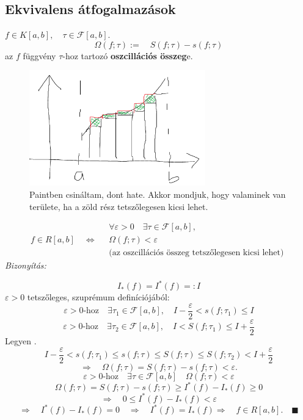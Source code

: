 \documentclass[a4paper,11.5pt]{article}
\begin{document}
	\subsection{Ekvivalens átfogalmazások}
	\begin{definition}
		$f\in K[a,b],\quad \tau\in\mathcal{F}[a,b]$.
		\[ \varOmega(f;\tau):=\quad S(f;\tau)-s(f;\tau) \]
		az $f$ függvény $\tau$-hoz tartozó \textbf{oszcillációs összeg}e.
	\end{definition}
	\begin{note}
		\begin{figure}[H]
			\centering
			\includegraphics[height=5cm]{kepek/tau.png}
			\caption{Paintben csináltam, dont hate. Akkor mondjuk, hogy valaminek van területe, ha a zöld rész tetszőlegesen kicsi lehet.}\label{}
		\end{figure}
	\end{note}
	\begin{theorem}
		\[ f\in R[a,b]\quad \Leftrightarrow\quad \begin{gathered}
			\forall\varepsilon>0\quad \exists\tau\in\mathcal{F}[a,b],\\
			\varOmega(f;\tau)<\varepsilon\\
			\text{(az oszcillációs összeg tetszőlegesen kicsi lehet)}
		\end{gathered} \]
		\textit{Bizonyítás:}
		
		\fbox{$\Rightarrow:$}
		\[ I_*(f)=I^*(f)=:I \]
		$\varepsilon>0$ tetszőleges, szuprémum definíciójából:
		\[ \varepsilon>0\text{-hoz}\quad \exists\tau_1\in\mathcal{F}[a,b],\quad I-\frac{\varepsilon}{2}<s(f;\tau_1)\leq I \]
		\[ \varepsilon>0\text{-hoz}\quad \exists\tau_2\in\mathcal{F}[a,b],\quad I<S(f;\tau_1)\leq I+\frac{\varepsilon}{2} \]
		Legyen .
		\[ I-\frac{\varepsilon}{2}<s(f;\tau_1)\leq s(f;\tau)\leq S(f;\tau)\leq S(f;\tau_2)<I+\frac{\varepsilon}{2} \]
		\[ \Rightarrow\quad\varOmega(f;\tau)= S(f;\tau)-s(f;\tau)<\varepsilon. \]
		\fbox{$\Leftarrow:$}
		\[ \varepsilon>0\text{-hoz}\quad \exists\tau\in\mathcal{F}[a,b]\quad \varOmega(f;\tau)<\varepsilon \]
		\[ \varOmega(f;\tau)=S(f;\tau)-s(f;\tau)\geq I^*(f)-I_*(f)\geq 0 \]
		\[ \Rightarrow\quad 0\leq I^*(f)-I_*(f)<\varepsilon \]
		\[ \Rightarrow\quad I^*(f)-I_*(f)=0\quad \Rightarrow\quad I^*(f)=I_*(f)\Rightarrow\quad f\in R[a,b].\quad \blacksquare \]
	\end{theorem}
\end{document}
